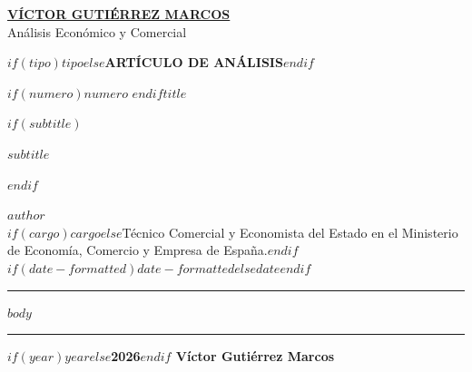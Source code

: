 \documentclass[$if(fontsize)$$fontsize$$else$11pt$endif$,$if(papersize)$$papersize$$else$a4paper$endif$]{article}
\begin{document}
\begin{center}
{\Large\bfseries\sffamily\color{primario} \href{https://www.victorgutierrezmarcos.es}{VÍCTOR GUTIÉRREZ MARCOS}}\\[0.3em]
{\small\sffamily\color{textomuted} Análisis Económico y Comercial}
\end{center}

\vspace{0.5cm}
\noindent\colorbox{primario}{%
    \parbox{\dimexpr\linewidth-2\fboxsep}{%
        \centering\color{white}\bfseries\sffamily\large
        \vspace{0.4cm}
        $if(tipo)$$tipo$$else$ARTÍCULO DE ANÁLISIS$endif$
        \vspace{0.4cm}
    }%
}
\vspace{0.8cm}

{\LARGE\color{primario}$if(numero)$\textbf{$numero$} $endif$$title$\par}
\vspace{0.3cm}

$if(subtitle)$
{\large\itshape\color{primario}$subtitle$\par}
\vspace{0.3cm}
$endif$

{\normalsize\textbf{$author$}\\
{\small\color{textomuted}$if(cargo)$$cargo$$else$Técnico Comercial y Economista del Estado en el Ministerio de Economía, Comercio y Empresa de España.$endif$}\\
$if(date-formatted)$$date-formatted$$else$$date$$endif$\par}

\vspace{0.8cm}
\noindent\rule{\linewidth}{0.4pt}
\vspace{0.5cm}

$body$

\vspace{1cm}
\noindent\rule{\linewidth}{2pt}

\vspace{0.5cm}
\begin{center}
{\small\bfseries\sffamily\color{primario} \textcopyright{} $if(year)$$year$$else$2026$endif$ Víctor Gutiérrez Marcos}
\end{center}
\end{document}
